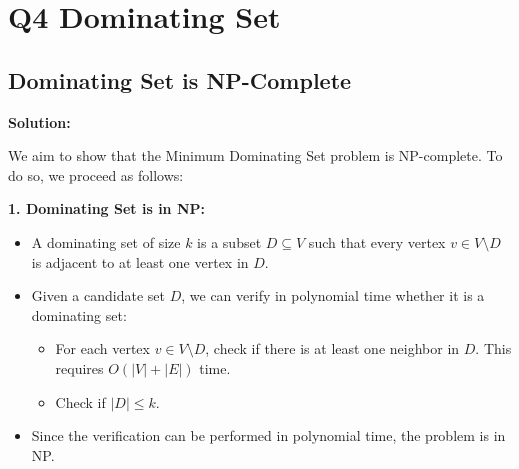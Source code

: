 \documentclass[11pt]{article}
\newenvironment{solution}{%
    \par\noindent\textbf{Solution:}\par%
}{\par}
\begin{document}
\newpage

\section*{Q4 Dominating Set}

\subsection*{Dominating Set is NP-Complete}

\begin{solution}
We aim to show that the Minimum Dominating Set problem is NP-complete. To do so, we proceed as follows:

\textbf{1. Dominating Set is in NP:}
\begin{itemize}
    \item A dominating set of size \( k \) is a subset \( D \subseteq V \) such that every vertex \( v \in V \setminus D \) is adjacent to at least one vertex in \( D \).
    \item Given a candidate set \( D \), we can verify in polynomial time whether it is a dominating set:
    \begin{itemize}
        \item For each vertex \( v \in V \setminus D \), check if there is at least one neighbor in \( D \). This requires \( O(|V| + |E|) \) time.
        \item Check if \( |D| \leq k \).
    \end{itemize}
    \item Since the verification can be performed in polynomial time, the problem is in NP.
\end{itemize}


\end{solution}
\end{document}
